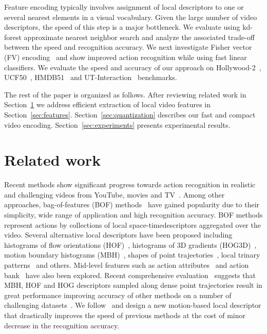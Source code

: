 \documentclass[10pt,twocolumn,letterpaper]{article}
\begin{document}
Feature encoding typically involves assignment of local
descriptors to one or several nearest elements in a visual
vocabulary. Given the large number of video descriptors, the
speed of this step is a major bottleneck. We evaluate using
kd-forest approximate nearest neighbor search \cite{Philbin07}
and analyze the associated trade-off between the speed and
recognition accuracy. We next investigate Fisher vector (FV)
encoding~\cite{Perronnin12} and show improved action recognition while using fast linear classifiers.
We evaluate the speed and accuracy of our approach on
\mbox{Hollywood-2}~\cite{Marszalek09}, UCF50~\cite{Reddy12},
HMDB51~\cite{Kuehne11} and UT-Interaction~\cite{Ryoo10}
benchmarks.

The rest of the paper is organized as follows. 
After reviewing related work in Section~\ref{sec:relatedwork} we address efficient extraction of local video features in
Section~\ref{sec:features}. Section~\ref{sec:quantization}
describes our fast and compact video encoding.
Section~\ref{sec:experiments} presents experimental results.



\section{Related work}
\label{sec:relatedwork}
Recent methods show significant progress towards action
recognition in realistic and challenging videos from YouTube,
movies and
TV~\cite{Laptev08,Laptev07,Liu11,Niebles10,Rodriguez08,Sadanand12,Wang12}.
Among other approaches, bag-of-features (BOF)
methods~\cite{Dollar05,Laptev05,Schuldt04} have gained
popularity due to their simplicity, wide range of application
and high recognition accuracy.
BOF methods represent actions by collections of local space-timedescriptors aggregated over the video.
Several alternative local descriptors have been proposed
including histograms of flow orientations (HOF)~\cite{Laptev08},
histograms of 3D gradients
(HOG3D)~\cite{klaser2008spatio,Scovanner07}, motion boundary
histograms (MBH)~\cite{Dalal06,Wang12}, shapes of point
trajectories~\cite{Matikainen09,Messing09,Wang12}, local trinary patterns~\cite{Kliper12,Yeffet09} and others. 
Mid-level features such as action attributes~\cite{Liu11} and action
bank~\cite{Sadanand12} have also been explored. Recent
comprehensive evaluation~\cite{Wang12} suggests that MBH, HOF
and HOG descriptors sampled along dense point trajectories
result in great performance improving accuracy of other
methods on a number of challenging datasets~\cite{Wang12}. 
We follow~\cite{Wang12} and design a new motion-based local
descriptor that drastically improves the speed of previous
methods at the cost of minor decrease in the recognition
accuracy.
\end{document}
